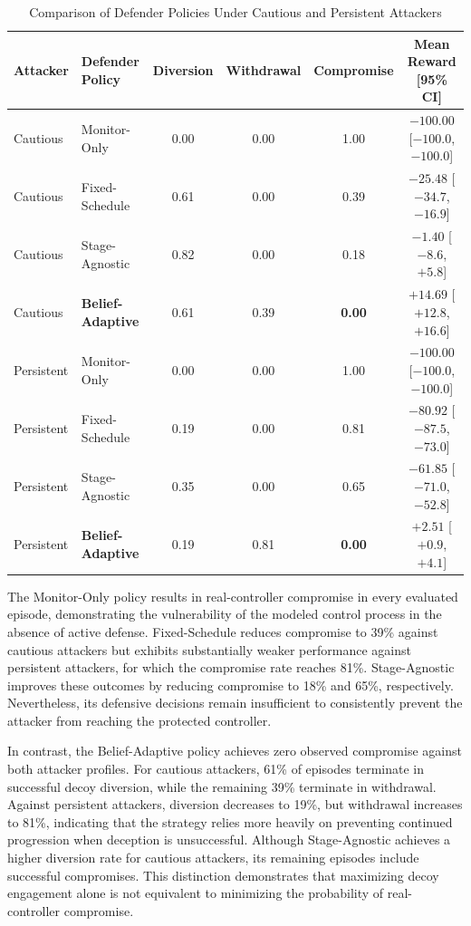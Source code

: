 \documentclass[10pt,conference]{IEEEtran}
\begin{document}
\begin{table}[t]
\centering
\caption{Comparison of Defender Policies Under Cautious and Persistent Attackers}
\label{tab:h1_results}
\footnotesize
\begin{tabular}{llcccc}
\hline
\textbf{Attacker} & \textbf{Defender Policy} &
\textbf{Diversion} & \textbf{Withdrawal} &
\textbf{Compromise} & \textbf{Mean Reward [95\% CI]} \\
\hline
Cautious & Monitor-Only & 0.00 & 0.00 & 1.00 & $-100.00$ [$-100.0$, $-100.0$] \\
Cautious & Fixed-Schedule & 0.61 & 0.00 & 0.39 & $-25.48$ [$-34.7$, $-16.9$] \\
Cautious & Stage-Agnostic & 0.82 & 0.00 & 0.18 & $-1.40$ [$-8.6$, $+5.8$] \\
Cautious & \textbf{Belief-Adaptive} & 0.61 & 0.39 & \textbf{0.00} & $\mathbf{+14.69}$ [$+12.8$, $+16.6$] \\
\hline
Persistent & Monitor-Only & 0.00 & 0.00 & 1.00 & $-100.00$ [$-100.0$, $-100.0$] \\
Persistent & Fixed-Schedule & 0.19 & 0.00 & 0.81 & $-80.92$ [$-87.5$, $-73.0$] \\
Persistent & Stage-Agnostic & 0.35 & 0.00 & 0.65 & $-61.85$ [$-71.0$, $-52.8$] \\
Persistent & \textbf{Belief-Adaptive} & 0.19 & 0.81 & \textbf{0.00} & $\mathbf{+2.51}$ [$+0.9$, $+4.1$] \\
\hline
\end{tabular}
\end{table}

The Monitor-Only policy results in real-controller compromise in every evaluated episode, demonstrating the vulnerability of the modeled control process in the absence of active defense. Fixed-Schedule reduces compromise to 39\% against cautious attackers but exhibits substantially weaker performance against persistent attackers, for which the compromise rate reaches 81\%. Stage-Agnostic improves these outcomes by reducing compromise to 18\% and 65\%, respectively. Nevertheless, its defensive decisions remain insufficient to consistently prevent the attacker from reaching the protected controller.

In contrast, the Belief-Adaptive policy achieves zero observed compromise against both attacker profiles. For cautious attackers, 61\% of episodes terminate in successful decoy diversion, while the remaining 39\% terminate in withdrawal. Against persistent attackers, diversion decreases to 19\%, but withdrawal increases to 81\%, indicating that the strategy relies more heavily on preventing continued progression when deception is unsuccessful. Although Stage-Agnostic achieves a higher diversion rate for cautious attackers, its remaining episodes include successful compromises. This distinction demonstrates that maximizing decoy engagement alone is not equivalent to minimizing the probability of real-controller compromise.
\end{document}

